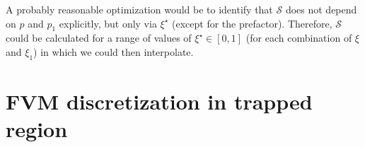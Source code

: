 \documentclass[11pt,a4paper]{article}
\newcommand{\rd}{\ensuremath{\mathrm{d}}}
\newcommand{\sub}[1]{\ensuremath{_{\text{#1}}}}
\begin{document}
A probably reasonable optimization would be to identify that $\mathcal{S}$ does not depend on $p$ and $p_1$ explicitly, but only via $\xi^\star$ (except for the prefactor). Therefore, $\mathcal{S}$ could be calculated for a range of values of $\xi^\star \in [0,1]$ (for each combination of $\xi$ and $\xi_1$) in which we could then interpolate.



\section{FVM discretization in trapped region}
\end{document}
